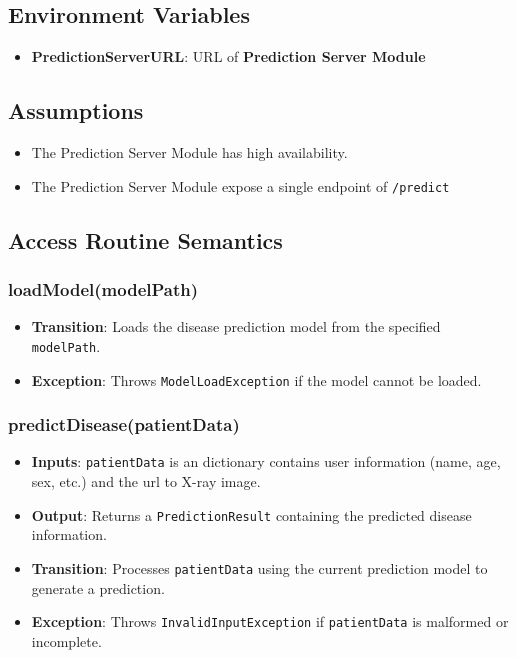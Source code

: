\documentclass[12pt, titlepage]{article}
\begin{document}
\subsection{Environment Variables}
\begin{itemize}
  \item \textbf{PredictionServerURL}: URL of \textbf{Prediction Server Module}
\end{itemize}

\subsection{Assumptions}
\begin{itemize}
    \item The Prediction Server Module has high availability. 
    \item The Prediction Server Module expose a single endpoint of \texttt{/predict}
\end{itemize}

\subsection{Access Routine Semantics}
\subsubsection{loadModel(modelPath)}

\begin{itemize}
    \item \textbf{Transition}: Loads the disease prediction model from the specified \texttt{modelPath}.
    \item \textbf{Exception}: Throws \texttt{ModelLoadException} if the model cannot be loaded.
\end{itemize}

\subsubsection{predictDisease(patientData)}
\begin{itemize}
    \item \textbf{Inputs}: \texttt{patientData} is an dictionary contains user information (name, age, sex, etc.) and the url to X-ray image.
    \item \textbf{Output}: Returns a \texttt{PredictionResult} containing the predicted disease information.
    \item \textbf{Transition}: Processes \texttt{patientData} using the current prediction model to generate a prediction.
    \item \textbf{Exception}: Throws \texttt{InvalidInputException} if \texttt{patientData} is malformed or incomplete.
\end{itemize}
\end{document}
